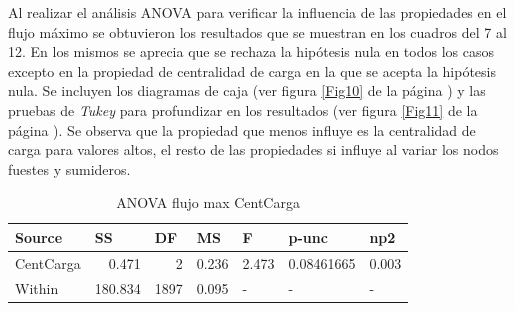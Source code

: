 \documentclass{article}
\begin{document}
Al realizar el análisis ANOVA para verificar la influencia de las propiedades en el flujo máximo se obtuvieron los resultados que se muestran en los cuadros del 7 al 12. En los mismos se aprecia que se rechaza la hipótesis nula en todos los casos excepto en la propiedad de centralidad de carga en la que se acepta la hipótesis nula. Se incluyen los diagramas de caja (ver figura \ref{Fig10} de la página \pageref{Fig10}) y las pruebas de \textit{Tukey} para profundizar en los resultados (ver figura \ref{Fig11} de la página \pageref{Fig11}). Se observa que la propiedad que menos influye es la centralidad de carga para valores altos, el resto de las propiedades si influye al variar los nodos fuestes y sumideros.

\begin{table}[htbp]
  \centering
  \caption{ANOVA flujo max CentCarga}
    \begin{tabular}{lrrrlll}
    \textbf{Source} & \multicolumn{1}{l}{\textbf{SS}} & \multicolumn{1}{l}{\textbf{DF}} & \multicolumn{1}{l}{\textbf{MS}} & \textbf{F} & \textbf{p-unc} & \textbf{np2} \\
    \midrule
    CentCarga & 0.471 & 2     & 0.236 & \multicolumn{1}{r}{2.473} & \multicolumn{1}{r}{0.08461665} & \multicolumn{1}{r}{0.003} \\
    Within & 180.834 & 1897  & 0.095 & -     & -     & - \\
    \bottomrule
    \end{tabular}%
  \label{tab:addlabel}%
\end{table}%
\end{document}
